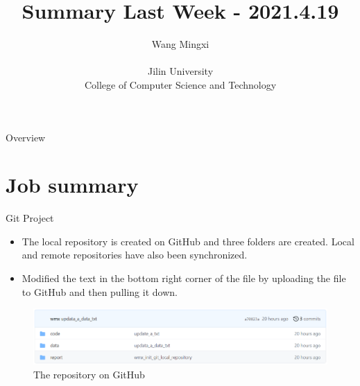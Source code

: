 \documentclass[
 size=14pt,
 paper=smartboard,  %
 mode=present, 		%
 display=slides, 	%
 style=tuliplab,  	%
 pauseslide,
 fleqn,leqno]{powerdot}
\title{Summary Last Week - 2021.4.19}
\author{
Wang Mingxi
\\
\\Jilin University
\\College of Computer Science and Technology
}
\date{\gitCommitterDate}
\begin{document}
\maketitle



\begin{slide}[toc=,bm=]{Overview}
\tableofcontents[content=currentsection,type=1]
\end{slide}


\section{Job summary}

\begin{slide}{Git Project}

\begin{itemize}
\item The local repository is created on GitHub and three folders are created.
Local and remote repositories have also been synchronized. %

\bigskip

\item Modified the text in the bottom right corner of the file by uploading the file to GitHub and then pulling it down.
\end{itemize}

\begin{center}
	\begin{figure}[htbp]
		\includegraphics[scale=0.6]{./pic/kaka2.eps}
		\caption{The repository on GitHub}
	\end{figure}
\end{center}

\end{slide}
\end{document}
